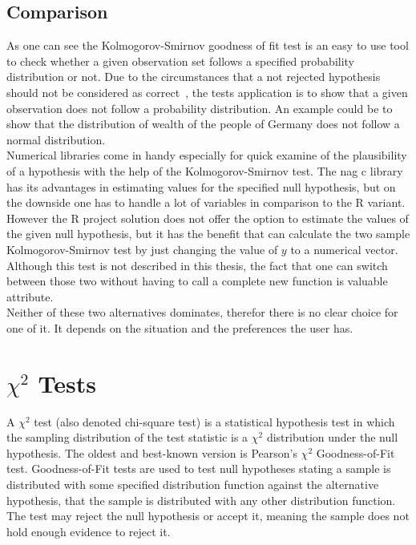 \documentclass{article}
\theoremstyle{definition}
\begin{document}
\subsection{Comparison}
As one can see the Kolmogorov-Smirnov goodness of fit test is an easy to use tool to check whether a given observation set follows a specified probability distribution or not.
Due to the circumstances that a not rejected hypothesis should not be considered as correct~\cite{conover1980practical}, the tests application is to show that a given observation does not follow a probability distribution. An example could be to show that the distribution of wealth of the people of Germany does not follow a normal distribution.\\
Numerical libraries come in handy especially for quick examine of the plausibility of a hypothesis with the help of the Kolmogorov-Smirnov test. The nag c library has its advantages 
in estimating values for the specified null hypothesis, but on the downside one has to handle a lot of variables in comparison to the R variant. However the R project solution does not offer the option to estimate the values of the given null hypothesis, but it has the benefit that can calculate the two sample Kolmogorov-Smirnov test by just changing the value of $y$ to a numerical vector. Although this test is not described in this thesis, the fact that one can switch between those two without having to call a complete new function is valuable attribute.\\
Neither of these two alternatives dominates, therefor there is no clear choice for one of it. It depends on the situation and the preferences the user has. 
\section{$\chi^2$ Tests}
A $\chi^2$ test (also denoted chi-square test) is a statistical hypothesis test in which the sampling distribution of the test statistic is a $\chi^2$ distribution under the null hypothesis.
The oldest and best-known version is Pearson's $\chi^2$ Goodness-of-Fit test.
Goodness-of-Fit tests are used to test null hypotheses stating a sample is distributed with some specified distribution function against the alternative hypothesis, that the sample is distributed with any other distribution function.
The test may reject the null hypothesis or accept it, meaning the sample does not hold enough evidence to reject it.
\end{document}
